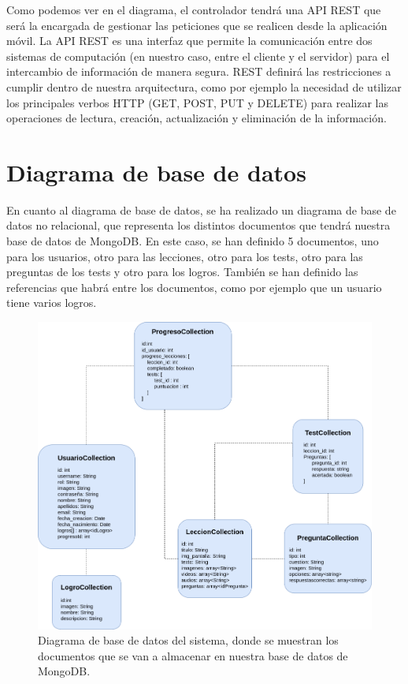 Como podemos ver en el diagrama, el controlador tendrá una API REST que será la encargada de gestionar las peticiones que se realicen desde la aplicación móvil. La API REST es una interfaz que permite la comunicación entre dos sistemas de computación (en nuestro caso, entre el cliente y el servidor) para
el intercambio de información de manera segura. REST definirá las restricciones a cumplir dentro de nuestra arquitectura, como por ejemplo la necesidad de utilizar los principales verbos HTTP (GET, POST, PUT y DELETE) para realizar las operaciones de lectura, creación, actualización y eliminación de la información.

\section{Diagrama de base de datos}
En cuanto al diagrama de base de datos, se ha realizado un diagrama de base de datos no relacional, que representa los distintos documentos 
que tendrá nuestra base de datos de MongoDB. En este caso, se han definido 5 documentos, uno para los usuarios, otro para las lecciones, otro para los tests, otro para las preguntas de los tests y otro para
los logros. También se han definido las referencias que habrá entre los documentos, como por ejemplo que un usuario tiene varios logros.

\begin{figure}[H]
    \centering
    \centerline{\includegraphics[width=\textwidth]{imagenes/c6/bbdd.png}}
    \caption{Diagrama de base de datos del sistema, donde se muestran los documentos que se van a almacenar en nuestra base de datos de MongoDB.}
    \label{fig:diagramadebbdd}    
\end{figure}

